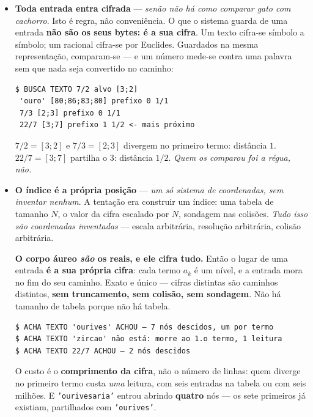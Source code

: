 \documentclass[11pt]{article}
\newcommand{\code}[1]{\texttt{\small #1}}
\theoremstyle{plain}
\theoremstyle{remark}
\begin{document}
\begin{itemize}
Os textos vivem no \textbf{ficheiro de memória}, nunca em RAM. Mas a varredura é
\textbf{linear} nas linhas --- e é por isso que ela não é o fim.

\item \textbf{Toda entrada entra cifrada} --- \emph{senão não há como comparar gato com cachorro}.
Isto é regra, não conveniência. O que o sistema guarda de uma entrada \textbf{não são os seus
bytes: é a sua cifra}. Um texto cifra-se símbolo a símbolo; um racional cifra-se por Euclides.
Guardados na mesma representação, comparam-se --- e um número mede-se contra uma palavra sem que
nada seja convertido no caminho:

\begin{verbatim}
$ BUSCA TEXTO 7/2 alvo [3;2]
 'ouro' [80;86;83;80] prefixo 0 1/1
 7/3 [2;3] prefixo 0 1/1
 22/7 [3;7] prefixo 1 1/2 <- mais próximo
\end{verbatim}

$7/2 = [3;2]$ e $7/3 = [2;3]$ divergem no primeiro termo: distância $1$. $22/7 = [3;7]$ partilha o
$3$: distância $1/2$. \emph{Quem os comparou foi a régua, não.}

\item \textbf{O índice é a própria posição} --- \emph{um só sistema de coordenadas, sem inventar
nenhum}. A tentação era construir um índice: uma tabela de tamanho $N$, o valor da cifra escalado
por $N$, sondagem nas colisões. \emph{Tudo isso são coordenadas inventadas} --- escala arbitrária,
resolução arbitrária, colisão arbitrária.

\textbf{O corpo áureo \emph{são} os reais, e ele cifra tudo.} Então o lugar de uma entrada
\textbf{é a sua própria cifra}: cada termo $a_k$ é um nível, e a entrada mora no fim do seu
caminho. Exato e único --- cifras distintas são caminhos distintos, \textbf{sem truncamento, sem
colisão, sem sondagem}. Não há tamanho de tabela porque não há tabela.

\begin{verbatim}
$ ACHA TEXTO 'ourives' ACHOU — 7 nós descidos, um por termo
$ ACHA TEXTO 'zircao' não está: morre ao 1.o termo, 1 leitura
$ ACHA TEXTO 22/7 ACHOU — 2 nós descidos
\end{verbatim}

O custo é o \textbf{comprimento da cifra}, não o número de linhas: quem diverge no primeiro termo
custa \emph{uma} leitura, com seis entradas na tabela ou com seis milhões. E \code{'ourivesaria'}
entrou abrindo \textbf{quatro} nós --- os sete primeiros já existiam, partilhados com
\code{'ourives'}.


\end{itemize}
\end{document}
